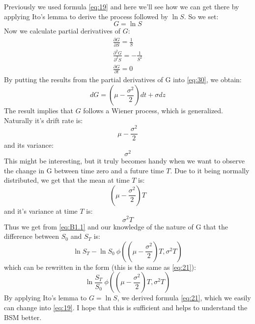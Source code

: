 \documentclass{article}
\begin{document}
Previously we used formula \ref{eq:19} and here we'll see how we can get there by applying Ito's lemma to derive the process followed by $\ln S$. So we set:
\begin{equation}
    G = \ln S
\end{equation}
Now we calculate partial derivatives of $G$:
\begin{gather}
    \frac{\partial G}{\partial S} = \frac{1}{S}\\
    \frac{\partial^2 G}{\partial^2 S} = -\frac{1}{S^2}\\
    \frac{\partial G}{\partial t} = 0
\end{gather}
By putting the results from the partial derivatives of G into \ref{eq:30}, we obtain:
\begin{equation}\label{eq:B1.1}
    dG = (\mu - \frac{\sigma^2}{2}) dt + \sigma dz
\end{equation}
The result implies that $G$ follows a Wiener process, which is generalized. Naturally it's drift rate is:
\begin{equation}
    \mu - \frac{\sigma^2}{2}
\end{equation}
and its variance:
\begin{equation}
    \sigma^2
\end{equation}
This might be interesting, but it truly becomes handy when we want to observe the change in G between time zero and a future time $T$. Due to it being normally distributed, we get that the mean at time $T$ is:
\begin{equation}
    (\mu - \frac{\sigma^2}{2}) T
\end{equation}
and it's variance at time $T$ is:
\begin{equation}
    \sigma^2 T
\end{equation}
Thus we get from \ref{eq:B1.1} and our knowledge of the nature of G that the difference between $S_0$ and $S_T$ is:
\begin{equation}
    \ln S_T - \ln S_0 ~ \phi\left((\mu - \frac{\sigma^2}{2}) T, \sigma^2 T\right)
\end{equation}
which can be rewritten in the form (this is the same as \ref{eq:21}):
\begin{equation}
    \ln{\frac{S_T}{S_0}} ~ \phi\left((\mu - \frac{\sigma^2}{2}) T, \sigma^2 T\right)
\end{equation}
By applying Ito's lemma to $G = \ln S$, we derived formula \ref{eq:21}, which we easily can change into \ref{eq:19}. I hope that this is sufficient and helps to understand the BSM better.
\end{document}
